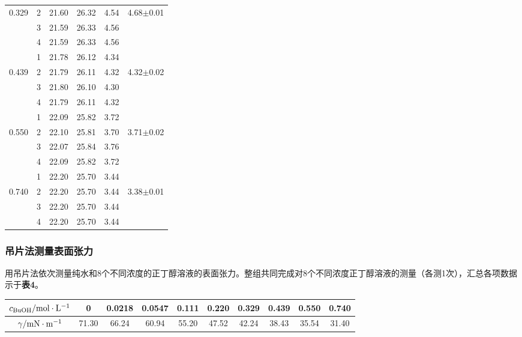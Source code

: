 \documentclass[12pt]{article}
\begin{document}
\begin{table}[h]
\begin{tabular}{cccccc}
		   0.329  & 2  &21.60 & 26.32 & 4.54 & 4.68$\pm$0.01\\
		   ~      & 3  &21.59 & 26.33 & 4.56 & \\
		   		  & 4  &21.59 & 26.33 & 4.56 & \\
		   \midrule
		   ~      & 1  &21.78 & 26.12 & 4.34 & ~ \\
		   0.439  & 2  &21.79 & 26.11 & 4.32 & 4.32$\pm$0.02\\
		   ~      & 3  &21.80 & 26.10 & 4.30 & \\
		   		  & 4  &21.79 & 26.11 & 4.32 & \\
		   \midrule
		   ~      & 1  &22.09 & 25.82 & 3.72 & ~ \\
		   0.550  & 2  &22.10 & 25.81 & 3.70 & 3.71$\pm$0.02\\
		   ~      & 3  &22.07 & 25.84 & 3.76 & \\
		   		  & 4  &22.09 & 25.82 & 3.72 & \\
		   \midrule
		   ~      & 1  &22.20 & 25.70 & 3.44 & ~ \\
		   0.740  & 2  &22.20 & 25.70 & 3.44 & 3.38$\pm$0.01\\
		   ~      & 3  &22.20 & 25.70 & 3.44 & \\
		   		  & 4  &22.20 & 25.70 & 3.44 & \\
					\bottomrule
				\end{tabular}
			\end{table}
		   \par 
		\subsubsection{吊片法测量表面张力}
		用吊片法依次测量纯水和8个不同浓度的正丁醇溶液的表面张力。整组共同完成对8个不同浓度正丁醇溶液的测量（各测1次），汇总各项数据示于\textbf{表4}。
		\begin{table}[h]
			\centering
			\begin{tabular}{cccccccccc}
				\toprule
				$c_{\rm BuOH}/{\rm mol\cdot L^{-1}}$  	& 0		& 0.0218& 0.0547& 0.111& 0.220& 0.329& 0.439& 0.550& 0.740\\
				\midrule
				$\gamma/{\rm mN\cdot m^{-1}}$ 			& 71.30 & 66.24 & 60.94 & 55.20& 47.52& 42.24& 38.43& 35.54& 31.40\\
				\bottomrule
			\end{tabular}
		\end{table}
\end{document}
